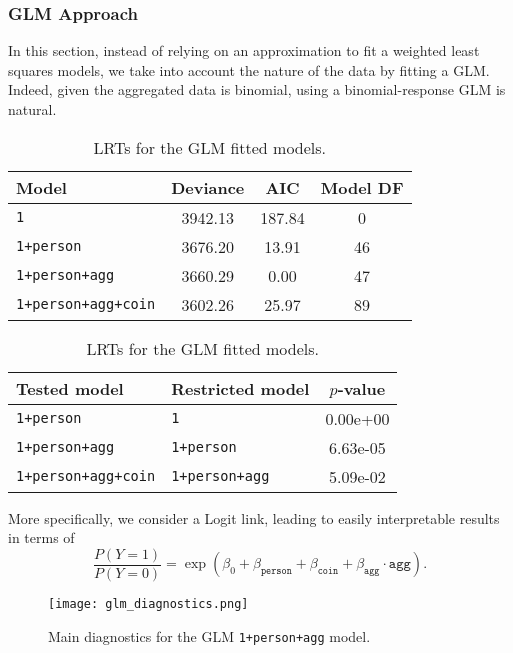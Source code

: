 \documentclass[a4paper, 12pt,oneside]{article}
\begin{document}
			\subsubsection{GLM Approach}
			In this section, instead of relying on an approximation to fit a weighted least squares models, we take into account the nature of the data by fitting a GLM. Indeed, given the aggregated data is binomial, using a binomial-response GLM is natural. 
			\begin{table}[htb]
				\centering
				\begin{subtable}{\textwidth}
					\centering
					\caption{Analysis of deviance of the GLM \texttt{1+person+agg+coin} model and AIC values.}
					\label{tab:glm-model-comparison}
					\begin{tabular}{lccc}
					\toprule
					Model & Deviance & AIC & Model DF \\
					\midrule
					\texttt{1} & 3942.13 & 187.84 & 0 \\
					\texttt{1+person} & 3676.20 & 13.91 & 46 \\
					\texttt{1+person+agg} & 3660.29 & 0.00 & 47 \\
					\texttt{1+person+agg+coin} & 3602.26 & 25.97 & 89 \\
					\bottomrule
					\end{tabular}
				\end{subtable}

				\begin{subtable}{\textwidth}
					\centering
					\caption{LRTs for the GLM fitted models.}
					\label{tab:glm-lrt-comparison}
					\begin{tabular}{llc}
					\toprule
					Tested model & Restricted model & $p$-value \\
					\midrule
					\texttt{1+person} & \texttt{1} & 0.00e+00 \\
					\texttt{1+person+agg} & \texttt{1+person} & 6.63e-05 \\
					\texttt{1+person+agg+coin} & \texttt{1+person+agg} & 5.09e-02 \\
					\bottomrule
					\end{tabular}
				\end{subtable}
			\end{table}

			More specifically, we consider a Logit link, leading to easily interpretable results in terms of 
			\begin{equation}
				\label{eq:glm_model}
				\frac{P(Y=1)}{P(Y=0)} = 
				\exp(\beta_0 + \beta_{\texttt{person}}+\beta_{\texttt{coin}} +\beta_{\texttt{agg}}\cdot\texttt{agg}).
			\end{equation}
			\begin{figure}[h!]
				\centering
				\texttt{[image: glm\_diagnostics.png]}
				\caption{Main diagnostics for the GLM \texttt{1+person+agg} model.}
				\label{fig:glm-diagnostic}
			\end{figure}
\end{document}
